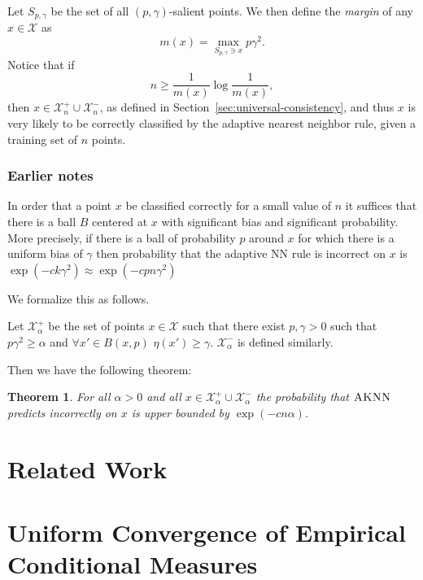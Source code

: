 \documentclass{article}
\def\X{{\mathcal X}}
\newcommand{\algname}{\textsc{AKNN}}
\newtheorem{theorem}{Theorem}
\newcommand{\comment}[3]{}  %
\newcommand{\shay}[1]{\comment{purple}{Shay}{#1}}
\newcommand{\akshay}[1]{\comment{blue}{Akshay}{#1}}
\begin{document}
Let $S_{p, \gamma}$ be the set of all $(p, \gamma)$-salient points. We then define the {\it margin} of any $x \in \X$ as
$$ m(x) = \max_{S_{p, \gamma} \ni x} p \gamma^2 .$$
Notice that if 
$$ n \geq \frac{1}{m(x)} \log \frac{1}{m(x)} ,$$
then $x \in \X_n^+ \cup \X_n^-$, as defined in Section~\ref{sec:universal-consistency}, and thus $x$ is very likely to be correctly classified by the adaptive nearest neighbor rule, given a training set of $n$ points.
\shay{Should $\gamma,p$ depend on $\delta$ for this containment to hold? Note that the definitions of $\X_n^+,\X_n^-$ do depend on $\delta$.}
\akshay{Agreed, as in \Cref{thm:fastrate2}.}

\subsubsection{Earlier notes}

In order that a point $x$ be classified correctly for a small value of $n$ it suffices that there is a ball $B$ centered at $x$ with significant bias and significant probability. More precisely, if there is a ball of probability $p$ around $x$ for which there is a uniform bias of $\gamma$ then probability that the adaptive NN rule is incorrect 
on $x$ is $\exp(-c k \gamma^2) \approx \exp(-c p n \gamma^2)$

We formalize this as follows.

Let $\X_{\alpha}^+$ be the set of points $x \in \X$ such that there exist $p,\gamma>0$ such that $p \gamma^2 \geq \alpha$ and  $\forall x' \in B(x,p)$ $\eta(x')\geq \gamma$. $\X_{\alpha}^-$ is defined similarly.

Then we have the following theorem:
\begin{theorem}\label{thm:fastrate}
For all $\alpha>0$ and all $x \in \X_{\alpha}^+ \cup \X_{\alpha}^-$ the probability that $\algname$ predicts incorrectly on $x$ is upper bounded by $\exp(-c n \alpha)$.
\end{theorem}


\section{Related Work}




\section{Uniform Convergence of Empirical Conditional Measures}
\label{sec:ucecm}
\end{document}
